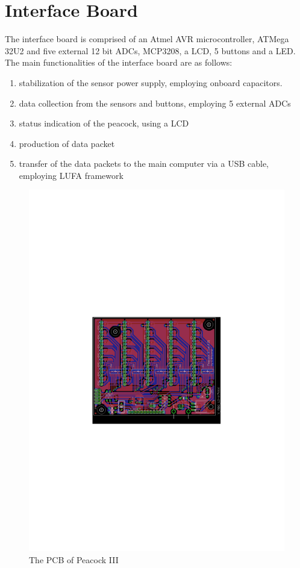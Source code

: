\documentclass{nime-alternate}
\begin{document}
\section{Interface Board} %

The interface board is comprised of an Atmel AVR microcontroller, ATMega 32U2 and five external 12 bit ADCs, MCP3208, a LCD, 5 buttons and a LED. The main functionalities of the interface board are as follows:

\begin{enumerate}
       \item stabilization of the sensor power supply, employing onboard capacitors.
       \item data collection from the sensors and buttons, employing 5 external ADCs
       \item status indication of the peacock, using a LCD
       \item production of data packet 
       \item transfer of the data packets to the main computer via a USB cable, employing LUFA framework
\end{enumerate}

\begin{figure}[htbp]
       \centering
              \includegraphics[width=1\columnwidth]{board}
       \caption{The PCB of Peacock III}
       \label{fig:board}
\end{figure}
\end{document}
